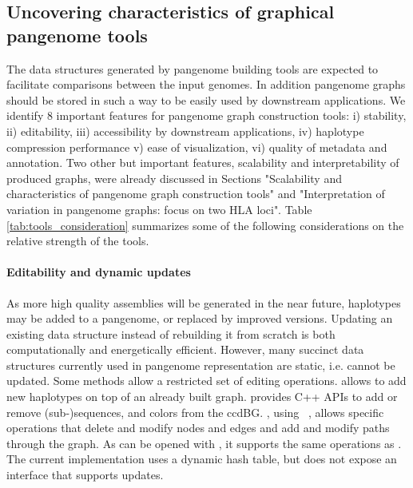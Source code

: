 \subsection*{\textbf{Uncovering characteristics of graphical pangenome tools}}
\label{sec:uncovering}
The data structures generated by pangenome building tools are expected to facilitate comparisons between the input genomes. In addition pangenome graphs should be stored in such a way to be easily used by downstream applications.
We identify 8 important features for pangenome graph construction tools: i) stability, ii) editability, iii) accessibility by downstream applications, iv) haplotype compression performance v) ease of visualization, vi) quality of metadata and annotation. Two other but important features, scalability and interpretability of produced graphs, were already discussed in Sections "Scalability and characteristics of pangenome graph construction tools" and "Interpretation of variation in pangenome graphs: focus on two HLA loci". %
Table \ref{tab:tools_consideration} summarizes some of the following considerations on the relative strength of the tools.

\paragraph{\textbf{\textup{Editability and dynamic updates}}}
As more high quality assemblies will be generated in the near future, haplotypes may be added to a pangenome, or replaced by improved versions. Updating an existing data structure instead of rebuilding it from scratch is both computationally and energetically efficient. 
However, many succinct data structures currently used in pangenome representation are static, i.e. cannot be updated. %
Some methods allow a restricted set of editing operations.
\minigraph allows to add new haplotypes on top of an already built graph. \bifrost provides C++ APIs to add or remove \mbox{(sub-)sequences}, \kmers and colors from the ccdBG.
\pggb, using \odgi~\cite{odgi}, allows specific operations that delete and modify nodes and edges and add and modify paths through the graph. As \mcactus can be opened with \odgi, it supports the same operations as \pggb. 
The current \mdbg implementation uses a dynamic hash table, but does not expose an interface that supports updates.

